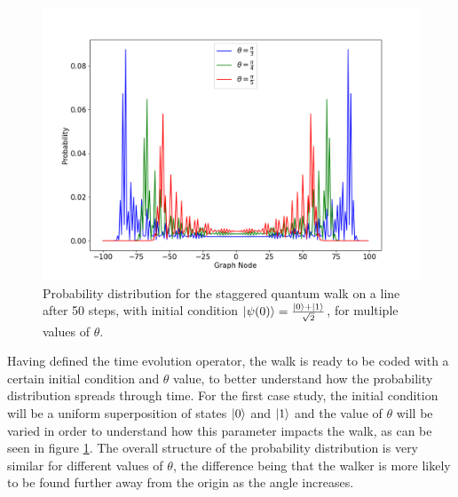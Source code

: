 \documentclass[../../dissertation.tex]{subfiles}
\begin{document}
\begin{figure}[!h]
	\centering
	\includegraphics[scale=0.40]{img/StagQuantumWalk/stagqwMultiple.png}
	\caption{Probability distribution for the staggered quantum walk on a line after 50 steps, with initial condition $\ket{\psi(0)}=\frac{\ket{0}+\ket{1}}{\sqrt{2}}$, for multiple values of $\theta$.} 
	\label{fig:stagQWSimulMultTheta}
\end{figure}
Having defined the time evolution operator, the walk is ready to be coded with
a certain initial condition and $\theta$ value, to better understand how the
probability distribution spreads through time. 
For the first case study, the initial condition will be a uniform superposition
of states $\ket{0}$ and $\ket{1}$ and the value of $\theta$ will be varied in
order to understand how this parameter impacts the walk, as can be seen in
figure \ref{fig:stagQWSimulMultTheta}. The overall structure of the
probability distribution is very similar for different values of $\theta$,
the difference being that the walker is more likely to be found further away
from the origin as the angle increases.\par
\end{document}
